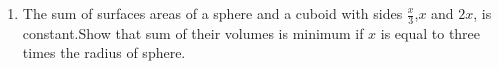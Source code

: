 \documentclass[10pt,-letter paper]{article}
\begin{document}
\begin{enumerate}
\item The sum of surfaces areas of a sphere and a cuboid with sides $\frac{x}{3}$,$x$ and $2x$, is constant.Show that sum of their volumes is minimum if $x$ is equal to three times the radius of sphere.\\

\end{enumerate}
\end{document}

